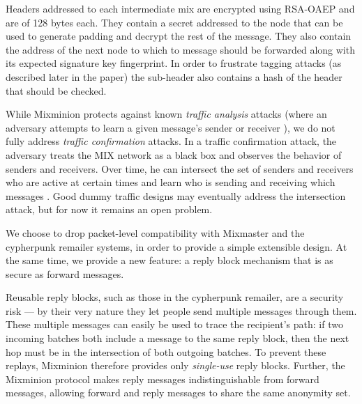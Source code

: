 \documentclass{llncs}
\begin{document}
Headers addressed to each intermediate mix are encrypted using RSA-OAEP
 \cite{PKCS1} and are of 128 bytes each. They contain a secret addressed
to the node that can be used to generate padding and decrypt the rest
of the message. They also contain the address of the next node to 
which to message should be forwarded along with its expected signature 
key fingerprint. In order to frustrate tagging attacks (as described later
in the paper) the sub-header also contains a hash of the header that
should be checked. 


While Mixminion protects against known \emph{traffic analysis} attacks
(where an adversary attempts to learn a given message's sender or
receiver \cite{rackoff93cryptographic,raymond00}), we do not fully
address \emph{traffic confirmation} attacks. In a traffic confirmation
attack, the adversary treats the MIX network as a black box and
observes the behavior of senders and receivers. Over time, he can
intersect the set of senders and receivers who are active at certain
times and learn who is sending and receiving which messages
\cite{langos02}. Good dummy traffic designs may eventually address the
intersection attack, but for now it remains an open problem.

We choose to drop packet-level compatibility with Mixmaster and the
cypherpunk remailer systems, in order to provide a simple extensible
design. At the same time, we provide a new feature: a reply block
mechanism that is as secure as forward messages.

Reusable reply blocks, such as those in the cypherpunk remailer, are a
security risk --- by their very nature they let people send multiple
messages through them.  These multiple messages can easily be used to
trace the recipient's path: if two incoming batches both include a
message to the same reply block, then the next hop must be in the
intersection of both outgoing batches.  To prevent these replays,
Mixminion therefore provides only \emph{single-use} reply
blocks. Further, the Mixminion protocol makes reply messages
indistinguishable from forward messages, allowing forward and reply
messages to share the same anonymity set.
\end{document}
